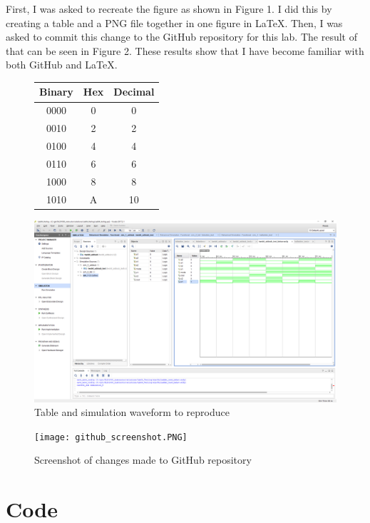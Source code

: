 \documentclass[11pt]{article}
\newcommand{\Verilog}[2][]{%
	
}
\begin{document}
First, I was asked to recreate the figure as shown in Figure 1. I did this by creating a table and a PNG file together in one figure in LaTeX. Then, I was asked to commit this change to the GitHub repository for this lab. The result of that can be seen in Figure 2. These results show that I have become familiar with both GitHub and LaTeX.

\begin{figure}[ht]\centering
	\begin{tabular}{c|c|c}
		\toprule Binary & Hex & Decimal \\
		\midrule
		0000 & 0 & 0 \\
		0010 & 2 & 2 \\
		0100 & 4 & 4 \\
		0110 & 6 & 6 \\
		1000 & 8 & 8 \\
		1010 & A & 10\\
		\bottomrule
	\end{tabular}\medskip

	\includegraphics[width=1\textwidth, trim=18.5cm 15.5cm 0.55cm 4.5cm, clip]{lab1_example_screenshot.PNG}
	\caption{Table and simulation waveform to reproduce}
	
\end{figure}

\begin{figure}[ht]\centering
	\texttt{[image: github\_screenshot.PNG]}
	\caption{Screenshot of changes made to GitHub repository}
\end{figure}


\section*{Code}

\Verilog[caption=Example Code from Canvas]{lab1_example_code.sv}
\end{document}
